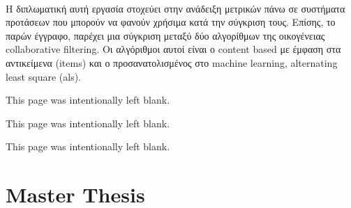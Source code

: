 \documentclass[12pt, a4paper, oneside, greek]{report}
\begin{document}
	\paragraph{} Η διπλωματική αυτή εργασία στοχεύει στην ανάδειξη μετρικών πάνω σε συστήματα προτάσεων που μπορούν να φανούν χρήσιμα κατά την σύγκριση τους. Επίσης, το παρών έγγραφο, παρέχει μια σύγκριση μεταξύ δύο αλγορίθμων της οικογένειας collaborative filtering. Οι αλγόριθμοι αυτοί είναι ο content based με έμφαση στα αντικείμενα (items) και ο προσανατολισμένος στο machine learning, alternating least square (als).
	\newpage
	
	\tableofcontents
	\newpage
	\begin{center}
		This page was intentionally left blank.
	\end{center}
	\newpage
	\listoftables
	\newpage
	\begin{center}
		This page was intentionally left blank.
	\end{center}
	\newpage
	\listoffigures
	\newpage
	
	\begin{center}
		This page was intentionally left blank.
	\end{center}
	\newpage
	\part{Master Thesis}
	
	
	
	
	
	\newpage
	
	
	
\end{document}
